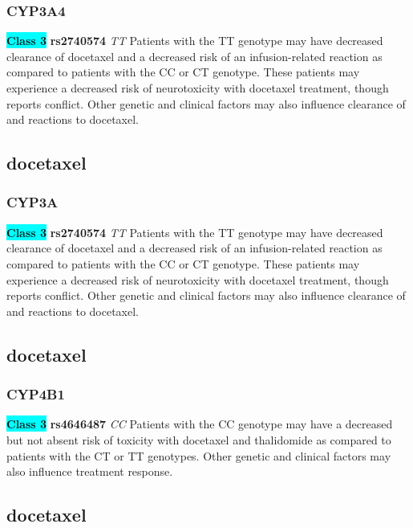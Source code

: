 \documentclass{book}
\begin{document}
\subsubsection{ CYP3A4 }

\begin{center}
\textbf{\colorbox{cyan} {Class 3}} \textbf{ rs2740574 } \textit{ TT }
Patients with the TT genotype may have decreased clearance of docetaxel and a decreased risk of an infusion-related reaction as compared to patients with the CC or CT genotype. These patients may experience a decreased risk of neurotoxicity with docetaxel treatment, though reports conflict. Other genetic and clinical factors may also influence clearance of and reactions to docetaxel.


\end{center}\subsection{ docetaxel }


\subsubsection{ CYP3A }

\begin{center}
\textbf{\colorbox{cyan} {Class 3}} \textbf{ rs2740574 } \textit{ TT }
Patients with the TT genotype may have decreased clearance of docetaxel and a decreased risk of an infusion-related reaction as compared to patients with the CC or CT genotype. These patients may experience a decreased risk of neurotoxicity with docetaxel treatment, though reports conflict. Other genetic and clinical factors may also influence clearance of and reactions to docetaxel.


\end{center}\subsection{ docetaxel }


\subsubsection{ CYP4B1 }

\begin{center}
\textbf{\colorbox{cyan} {Class 3}} \textbf{ rs4646487 } \textit{ CC }
Patients with the CC genotype may have a decreased but not absent risk of toxicity with docetaxel and thalidomide as compared to patients with the CT or TT genotypes. Other genetic and clinical factors may also influence treatment response.


\end{center}\subsection{ docetaxel }
\end{document}
